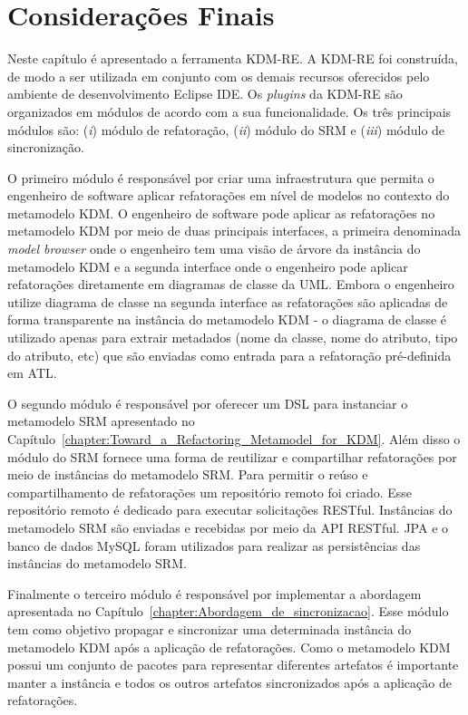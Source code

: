

\section{Considerações Finais}

Neste capítulo é apresentado a ferramenta KDM-RE. A KDM-RE foi construída, de modo a ser utilizada em conjunto com os demais recursos oferecidos pelo ambiente de desenvolvimento Eclipse IDE. Os \textit{plugins} da KDM-RE são organizados em módulos de acordo com a sua funcionalidade. Os três principais módulos são: (\textit{i}) módulo de refatoração, (\textit{ii}) módulo do SRM e (\textit{iii}) módulo de sincronização. 

O primeiro módulo é responsável por criar uma infraestrutura que permita o engenheiro de software aplicar refatorações em nível de modelos no contexto do metamodelo KDM. O engenheiro de software pode aplicar as refatorações no metamodelo KDM por meio de duas principais interfaces, a primeira denominada \textit{model browser} onde o engenheiro tem uma visão de árvore da instância do metamodelo KDM e a segunda interface onde o engenheiro pode aplicar refatorações diretamente em diagramas de classe da UML. Embora o engenheiro utilize diagrama de classe na segunda interface as refatorações são aplicadas de forma transparente na instância do metamodelo KDM - o diagrama de classe é utilizado apenas para extrair metadados (nome da classe, nome do atributo, tipo do atributo, etc) que são enviadas como entrada para a refatoração pré-definida em ATL.

O segundo módulo é responsável por oferecer um DSL para instanciar o metamodelo SRM apresentado no Capítulo~\ref{chapter:Toward_a_Refactoring_Metamodel_for_KDM}. Além disso o módulo do SRM fornece uma forma de reutilizar e compartilhar refatorações por meio de instâncias do metamodelo SRM. Para permitir o reúso e compartilhamento de refatorações um repositório remoto foi criado. Esse repositório remoto é dedicado para executar solicitações RESTful. Instâncias do metamodelo SRM são enviadas e recebidas por meio da API RESTful. JPA e o banco de dados MySQL foram utilizados para realizar as persistências das instâncias do metamodelo SRM.

Finalmente o terceiro módulo é responsável por implementar a abordagem apresentada no Capítulo~\ref{chapter:Abordagem_de_sincronizacao}. Esse módulo tem como objetivo propagar e sincronizar uma determinada instância do metamodelo KDM após a aplicação de refatorações. Como o metamodelo KDM possui um conjunto de pacotes para representar diferentes artefatos é importante manter a instância e todos os outros artefatos sincronizados após a aplicação de refatorações.